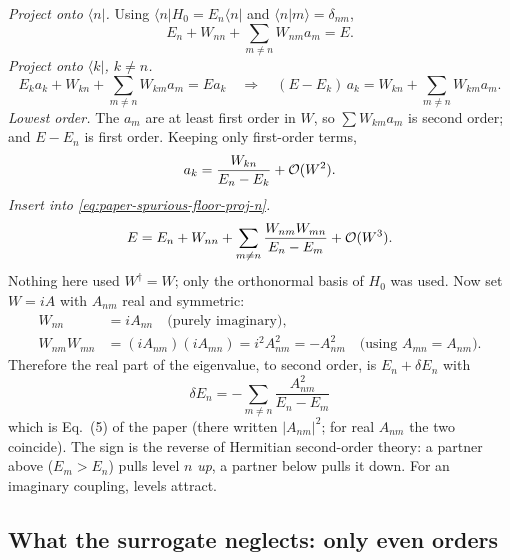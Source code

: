 \emph{Project onto $\langle n|$.} Using $\langle n|H_0=E_n\langle n|$ and $\langle n|m\rangle=\delta_{nm}$,
\begin{equation}
E_n+W_{nn}+\sum_{m\ne n}W_{nm}a_m=E .\label{eq:paper-spurious-floor-proj-n}
\end{equation}
\emph{Project onto $\langle k|$, $k\neq n$.}
\begin{equation}
E_ka_k+W_{kn}+\sum_{m\ne n}W_{km}a_m=Ea_k
\quad\Longrightarrow\quad
(E-E_k)\,a_k=W_{kn}+\sum_{m\ne n}W_{km}a_m .\label{eq:paper-spurious-floor-proj-k}
\end{equation}
\emph{Lowest order.} The $a_m$ are at least first order in $W$, so $\sum W_{km}a_m$ is second order; and $E-E_n$ is first order. Keeping only first-order terms,
\begin{equation}
a_k=\frac{W_{kn}}{E_n-E_k}+\mathcal{O}(W^2).\label{eq:paper-spurious-floor-ak}
\end{equation}
\emph{Insert into \cref{eq:paper-spurious-floor-proj-n}.}
\begin{equation}
E=E_n+W_{nn}+\sum_{m\ne n}\frac{W_{nm}W_{mn}}{E_n-E_m}+\mathcal{O}(W^3).\label{eq:paper-spurious-floor-RS2}
\end{equation}
Nothing here used $W^\dagger=W$; only the orthonormal basis of $H_0$ was used. Now set $W=iA$ with $A_{nm}$ real and symmetric:
\begin{align}
W_{nn}&=iA_{nn}\quad\text{(purely imaginary)},\label{eq:paper-spurious-floor-first}\\
W_{nm}W_{mn}&=(iA_{nm})(iA_{mn})=i^2A_{nm}^2=-A_{nm}^2\quad\text{(using }A_{mn}=A_{nm}).\label{eq:paper-spurious-floor-i2}
\end{align}
Therefore the real part of the eigenvalue, to second order, is $E_n+\delta E_n$ with
\begin{equation}
\boxed{\delta E_n=-\sum_{m\ne n}\frac{A_{nm}^2}{E_n-E_m}}\label{eq:paper-spurious-floor-eq5}
\end{equation}
which is Eq.~(5) of the paper (there written $|A_{nm}|^2$; for real $A_{nm}$ the two coincide). The sign is the reverse of Hermitian second-order theory: a partner above ($E_m>E_n$) pulls level $n$ \emph{up}, a partner below pulls it down. For an imaginary coupling, levels attract.

\subsection{What the surrogate neglects: only even orders}

